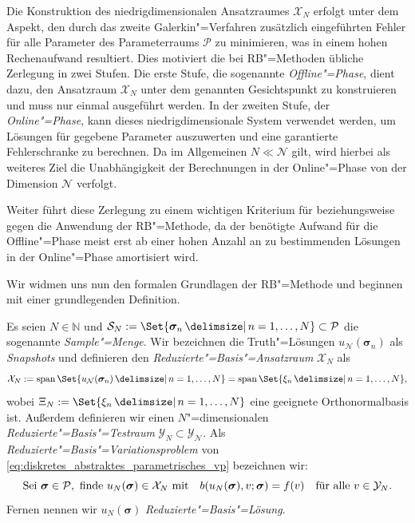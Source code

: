 \documentclass[../main.tex]{subfiles}
\begin{document}
Die Konstruktion des niedrigdimensionalen Ansatzraumes $\mathcal X_{N}$ erfolgt unter dem Aspekt, den durch das zweite Galerkin"=Verfahren zusätzlich eingeführten Fehler für alle Parameter des Parameterraums $\mathcal P$ zu minimieren, was in einem hohen Rechenaufwand resultiert.
Dies motiviert die bei RB"=Methoden übliche Zerlegung in zwei Stufen.
Die erste Stufe, die sogenannte \emph{Offline"=Phase}, dient dazu, den Ansatzraum $\mathcal X_{N}$ unter dem genannten Gesichtspunkt zu konstruieren und muss nur einmal ausgeführt werden.
In der zweiten Stufe, der \emph{Online"=Phase}, kann dieses niedrigdimensionale System verwendet werden, um Lösungen für gegebene Parameter auszuwerten und eine garantierte Fehlerschranke zu berechnen.
Da im Allgemeinen $N \ll \mathcal N$ gilt, wird hierbei als weiteres Ziel die Unabhängigkeit der Berechnungen in der Online"=Phase von der Dimension $\mathcal N$ verfolgt.

Weiter führt diese Zerlegung zu einem wichtigen Kriterium für beziehungsweise gegen die Anwendung der RB"=Methode, da der benötigte Aufwand für die Offline"=Phase meist erst ab einer hohen Anzahl an zu bestimmenden Lösungen in der Online"=Phase amortisiert wird.

Wir widmen uns nun den formalen Grundlagen der RB"=Methode und beginnen mit einer grundlegenden Definition.

\begin{Definition}
\label{definition:rb_variationsproblem}
    Es seien $N \in \mathbb{N}$ und $\mathcal S_{N} := \Set{ \bm \sigma_{n} \given n = 1, \dots, N } \subset \mathcal P$ die sogenannte \emph{Sample"=Menge}.
    Wir bezeichnen die Truth"=Lösungen $u_{\mathcal N}(\bm \sigma_{n})$ als \emph{Snapshots} und definieren den \emph{Reduzierte"=Basis"=Ansatzraum} $\mathcal X_{N}$ als
    \begin{equation}\label{eq:def_rb_ansatzraum}
        \mathcal X_{N} := \spn \Set{ u_{\mathcal N}(\bm \sigma_{n}) \given n = 1, \dots, N} = \spn \Set{ \xi_{n} \given n = 1, \dots, N},
    \end{equation}
    wobei $\Xi_{N} := \Set{ \xi_{n} \given n = 1, \dots, N}$ eine geeignete Orthonormalbasis ist.
    Außerdem definieren wir einen $N$"=dimensionalen \emph{Reduzierte"=Basis"=Testraum} $\mathcal Y_{N} \subset \mathcal Y_{\mathcal N}$.
    Als \emph{Reduzierte"=Basis"=Variationsproblem} von \cref{eq:diskretes_abstraktes_parametrisches_vp} bezeichnen wir:
    \begin{equation}
    \label{eq:rb_abstraktes_parametriches_vp}
        \text{Sei } \bm \sigma \in \mathcal P, \text{ finde } u_{N}(\bm \sigma) \in \mathcal X_{N} \text{ mit} \quad b(u_{N}(\bm \sigma), v; \bm \sigma) = f(v) \quad \fa v \in \mathcal Y_{N}.
    \end{equation}
    Fernen nennen wir $u_{N}(\bm \sigma)$ \emph{Reduzierte"=Basis"=Lösung}.
\end{Definition}
\end{document}
